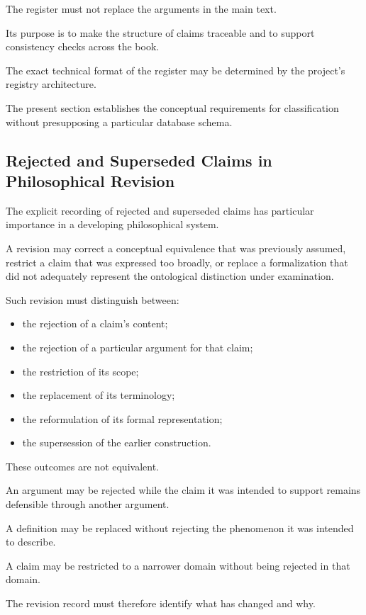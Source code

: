 The register
must not
replace the
arguments in
the main
text.

Its purpose
is to make
the structure
of claims
traceable and
to support
consistency checks
across the
book.

The exact
technical format
of the register
may be
determined by
the project's
registry architecture.

The present
section establishes
the conceptual
requirements
for classification
without presupposing
a particular
database schema.

\subsection{Rejected and Superseded Claims in Philosophical Revision}

The explicit
recording of
rejected and
superseded claims
has particular
importance in
a developing
philosophical system.

A revision
may correct
a conceptual
equivalence that
was previously
assumed, restrict
a claim
that was
expressed too
broadly, or
replace a
formalization
that did
not adequately
represent the
ontological
distinction
under examination.

Such revision
must distinguish
between:

\begin{itemize}
    \item the rejection
    of a claim's
    content;
    \item the rejection
    of a particular
    argument for
    that claim;
    \item the restriction
    of its scope;
    \item the replacement
    of its terminology;
    \item the reformulation
    of its formal
    representation;
    \item the supersession
    of the earlier
    construction.
\end{itemize}

These outcomes
are not equivalent.

An argument
may be rejected
while the
claim it
was intended
to support
remains defensible
through another
argument.

A definition
may be replaced
without rejecting
the phenomenon
it was intended
to describe.

A claim
may be restricted
to a narrower
domain without
being rejected
in that
domain.

The revision
record must
therefore identify
what has
changed and
why.

